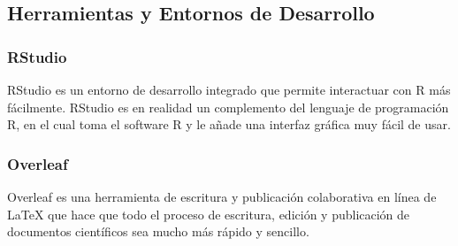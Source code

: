 \documentclass[../../main.tex]{subfiles}
\begin{document}
\subsection{Herramientas y Entornos de Desarrollo}

\subsubsection{RStudio}
RStudio\cite{doc15} es un entorno de desarrollo integrado que permite interactuar con R más fácilmente. RStudio es en realidad un complemento del lenguaje de programación R, en el cual toma el software R y le añade una interfaz gráfica muy fácil de usar.

\subsubsection{Overleaf}
Overleaf\cite{doc17} es una herramienta de escritura y publicación colaborativa en línea de LaTeX que hace que todo el proceso de escritura, edición y publicación de documentos científicos sea mucho más rápido y sencillo.
\end{document}
